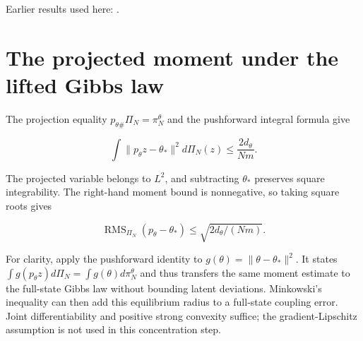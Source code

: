 \documentclass[11pt,a4paper]{article}
\begin{document}
Earlier results used here: \cite[Section~3.49.7]{LangevinLean2026ULASC}.

\section{\texorpdfstring{The projected moment under the lifted Gibbs law}{The projected moment under the lifted Gibbs law}}


The projection equality \(p_{\theta\#}\Pi_N=\pi_N^\theta\) and the pushforward integral formula give

\[\int\|p_\theta z-\theta_*\|^2d\Pi_N(z)\le\frac{2d_\theta}{Nm}.\]

The projected variable belongs to \(L^2\), and subtracting \(\theta_*\) preserves square integrability. The right-hand moment bound is nonnegative, so taking square roots gives

\[\operatorname{RMS}_{\Pi_N}(p_\theta-\theta_*)\le\sqrt{2d_\theta/(Nm)}.\]

For clarity, apply the pushforward identity to \(g(\theta)=\|\theta-\theta_*\|^2\). It states \(\int g(p_\theta z)d\Pi_N=\int g(\theta)d\pi_N^\theta\) and thus transfers the same moment estimate to the full-state Gibbs law without bounding latent deviations. Minkowski’s inequality can then add this equilibrium radius to a full-state coupling error. Joint differentiability and positive strong convexity suffice; the gradient-Lipschitz assumption is not used in this concentration step.
\end{document}
